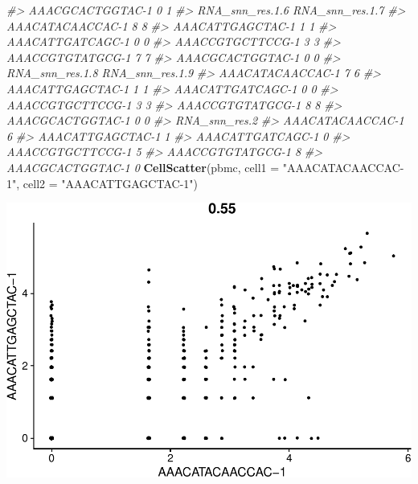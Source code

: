 \documentclass[
]{book}
\newenvironment{Shaded}{\begin{snugshade}}{\end{snugshade}}
\newcommand{\AttributeTok}[1]{\textcolor[rgb]{0.13,0.29,0.53}{#1}}
\newcommand{\CommentTok}[1]{\textcolor[rgb]{0.56,0.35,0.01}{\textit{#1}}}
\newcommand{\FunctionTok}[1]{\textcolor[rgb]{0.13,0.29,0.53}{\textbf{#1}}}
\newcommand{\NormalTok}[1]{#1}
\newcommand{\StringTok}[1]{\textcolor[rgb]{0.31,0.60,0.02}{#1}}
\begin{document}
\begin{Shaded}
\begin{Highlighting}[]
\CommentTok{\#\textgreater{} AAACGCACTGGTAC{-}1               0               1}
\CommentTok{\#\textgreater{}                  RNA\_snn\_res.1.6 RNA\_snn\_res.1.7}
\CommentTok{\#\textgreater{} AAACATACAACCAC{-}1               8               8}
\CommentTok{\#\textgreater{} AAACATTGAGCTAC{-}1               1               1}
\CommentTok{\#\textgreater{} AAACATTGATCAGC{-}1               0               0}
\CommentTok{\#\textgreater{} AAACCGTGCTTCCG{-}1               3               3}
\CommentTok{\#\textgreater{} AAACCGTGTATGCG{-}1               7               7}
\CommentTok{\#\textgreater{} AAACGCACTGGTAC{-}1               0               0}
\CommentTok{\#\textgreater{}                  RNA\_snn\_res.1.8 RNA\_snn\_res.1.9}
\CommentTok{\#\textgreater{} AAACATACAACCAC{-}1               7               6}
\CommentTok{\#\textgreater{} AAACATTGAGCTAC{-}1               1               1}
\CommentTok{\#\textgreater{} AAACATTGATCAGC{-}1               0               0}
\CommentTok{\#\textgreater{} AAACCGTGCTTCCG{-}1               3               3}
\CommentTok{\#\textgreater{} AAACCGTGTATGCG{-}1               8               8}
\CommentTok{\#\textgreater{} AAACGCACTGGTAC{-}1               0               0}
\CommentTok{\#\textgreater{}                  RNA\_snn\_res.2}
\CommentTok{\#\textgreater{} AAACATACAACCAC{-}1             6}
\CommentTok{\#\textgreater{} AAACATTGAGCTAC{-}1             1}
\CommentTok{\#\textgreater{} AAACATTGATCAGC{-}1             0}
\CommentTok{\#\textgreater{} AAACCGTGCTTCCG{-}1             5}
\CommentTok{\#\textgreater{} AAACCGTGTATGCG{-}1             8}
\CommentTok{\#\textgreater{} AAACGCACTGGTAC{-}1             0}
\FunctionTok{CellScatter}\NormalTok{(pbmc, }\AttributeTok{cell1 =} \StringTok{"AAACATACAACCAC{-}1"}\NormalTok{, }\AttributeTok{cell2 =} \StringTok{"AAACATTGAGCTAC{-}1"}\NormalTok{)}
\end{Highlighting}
\end{Shaded}

\includegraphics{scRNAseqInR_Doco_files/figure-latex/unnamed-chunk-30-1.pdf}
\end{document}
